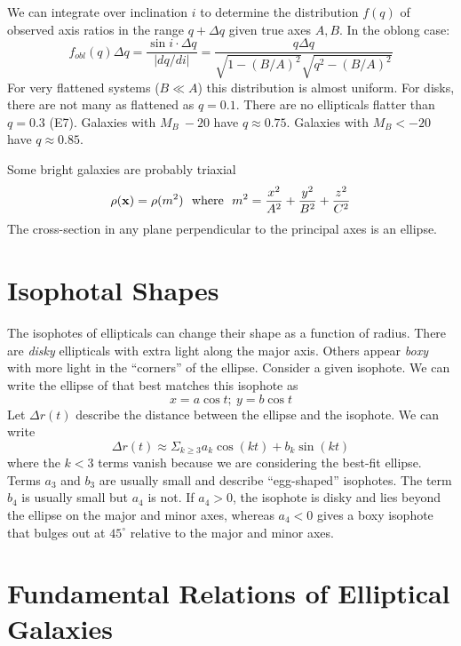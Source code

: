 \documentclass[]{article}
\begin{document}
We can integrate over inclination $i$ to determine the distribution $f(q)$ of observed axis
ratios in the range $q +\Delta q$ given true axes $A,B$.  In the oblong case:
\begin{equation}
f_{obl}(q) \Delta q = \frac{\sin i \cdot \Delta q}{|dq/di|} = \frac{q\Delta q}{\sqrt{1-(B/A)^2}\sqrt{q^2-(B/A)^2}}
\end{equation}
\noindent
For very flattened systems ($B\ll A$) this distribution is almost uniform.  
For disks, there are not many as flattened as $q=0.1$. There
are no ellipticals flatter than $q=0.3$ (E7).
Galaxies with $M_B~-20$ have $q\approx0.75$. Galaxies with $M_B<-20$ have $q\approx0.85$.

Some bright galaxies are probably triaxial
\begin{equation}
\rho(\mathbf{x}) = \rho(m^2)~~\mathrm{where}~~m^2 = \frac{x^2}{A^2} + \frac{y^2}{B^2} + \frac{z^2}{C^2}
\end{equation}
\noindent
The cross-section in any plane perpendicular to the principal axes is an ellipse.


\section{Isophotal Shapes}

The isophotes of ellipticals can change their shape as a function of
radius.  There are {\it disky} ellipticals with extra light along the major axis.
Others appear {\it boxy} with more light in the ``corners'' of the ellipse.
Consider a given isophote.  We can write the ellipse of that best matches this isophote as
\begin{equation}
x = a \cos t;~y=b\cos t
\end{equation}
\noindent
Let $\Delta r(t)$ describe the distance between the ellipse and the isophote.  We
can write
\begin{equation}
\Delta r(t) \approx \Sigma_{k\ge3} a_k \cos(k t) + b_k \sin(kt)
\end{equation}
\noindent
where the $k<3$ terms vanish because we are considering the best-fit ellipse.
Terms $a_3$ and $b_3$ are usually small and describe ``egg-shaped'' isophotes.
The term $b_4$ is usually small but $a_4$ is not.  If $a_4>0$, the
isophote is disky and lies beyond the ellipse on the major and minor axes, 
whereas $a_4<0$ gives a boxy isophote that bulges out at $45^{\circ}$ relative
to the major and minor axes.

\section{Fundamental Relations of Elliptical Galaxies}
\end{document}
